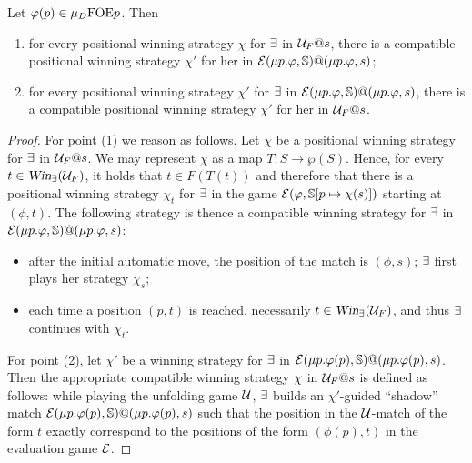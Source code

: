 \begin{proposition}\label{p:unfold=evalgame2}
Let %
$\varphi(p) \in \mu_{D}\mathrm{FOE}{p}$. Then 
\begin{enumerate}
\item  for every positional winning strategy $\chi$ for $\exists$ in $\mathcal{U}_F@s$, there is a compatible positional winning strategy $\chi'$ for her in 
$\mathcal{E}(\mu p.\varphi,\mathbb{S})@(\mu p.\varphi,s)$;%
\item  for every positional winning strategy $\chi'$ for $\exists$ in $\mathcal{E}(\mu p.\varphi,\mathbb{S})@(\mu p.\varphi,s)$, there is a compatible  positional winning strategy $\chi'$ for her in 
$\mathcal{U}_F@s$.%
\end{enumerate}
\end{proposition}
\begin{proof}
For point (1) we reason as follows. Let $\chi$  be a positional winning strategy for $\exists$ in $\mathcal{U}_F@s$. We may represent $\chi$ as a map $T: S \to \wp{(S)}$. Hence, for every $t \in \win_{\eloise}(\UG_{F})$, it holds that $t \in F(T(t))$ and therefore that there is a positional winning strategy $\chi_t$ for $\exists$ in the game $\mathcal{E}(\varphi,\mathbb{S}[p \mapsto \chi(s)])$ starting at $(\phi,t)$. The following  strategy is thence a compatible winning strategy for $\exists$ in $\mathcal{E}(\mu p.\varphi,\mathbb{S})@(\mu p.\varphi,s)$:
\begin{itemize}
\item after the initial automatic move, the position of the match is $(\phi,s)$; $\exists$ first plays her strategy $\chi_s$;
\item each time a position $(p,t)$ is reached, necessarily $t \in \win_{\eloise}(\UG_{F})$, and thus $\exists$ continues with $\chi_t$.
\end{itemize}
For point (2), let $\chi'$ be a winning strategy for $\exists$ in  $\mathcal{E}(\mu p.\varphi(p),\mathbb{S})@(\mu p.\varphi(p),s)$. Then the appropriate compatible winning strategy $\chi$ in   $\mathcal{U}_{F}@s$ is defined as follows: while playing the unfolding game $\mathcal{U}$, $\exists$ builds an $\chi'$-guided ``shadow'' match $\mathcal{E}(\mu p.\varphi(p),\mathbb{S})@(\mu p.\varphi(p),s)$ such that the position in the $\mathcal{U}$-match of the form $t$ exactly correspond to the positions of the form $(\phi(p),t)$ in the evaluation game $\mathcal{E}$. 
\end{proof}



